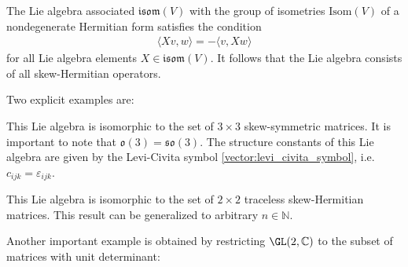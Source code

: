     \begin{example}[Isometries]
        The Lie algebra associated $\mathfrak{isom}(V)$ with the group of isometries $\mathrm{Isom}(V)$ of a nondegenerate Hermitian form satisfies the condition
        \begin{gather}
            \label{lie:lie_isometry}
            \langle Xv,w \rangle = -\langle v,Xw \rangle
        \end{gather}
        for all Lie algebra elements $X\in\mathfrak{isom}(V)$. It follows that the Lie algebra consists of all skew-Hermitian operators.
    \end{example}
    Two explicit examples are:
    \begin{example}\label{lie:so3}
        This Lie algebra is isomorphic to the set of $3\times3$ skew-symmetric matrices. It is important to note that $\mathfrak{o}(3)=\mathfrak{so}(3)$. The structure constants of this Lie algebra are given by the Levi-Civita symbol \ref{vector:levi_civita_symbol}, i.e.~$c_{ijk}=\varepsilon_{ijk}$.
    \end{example}
    \begin{example}
        This Lie algebra is isomorphic to the set of $2\times2$ traceless skew-Hermitian matrices. This result can be generalized to arbitrary $n\in\mathbb{N}$.
    \end{example}
    Another important example is obtained by restricting $\GL(2,\mathbb{C})$ to the subset of matrices with unit determinant:
